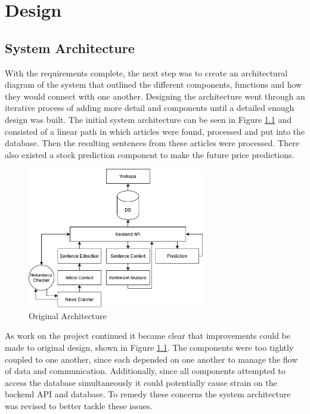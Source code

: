 \chapter{Design}
\label{Design}

    \section{System Architecture}
    \label{des:system_arch}
    With the requirements complete, the next step was to create an architectural diagram of the system that outlined the different components, functions and how they would connect with one another. Designing the architecture went through an iterative process of adding more detail and components until a detailed enough design was built. The initial system architecture can be seen in Figure \ref{fig:architecture_orginal} and consisted of a linear path in which articles were found, processed and put into the database. Then the resulting sentences from these articles were processed. There also existed a stock prediction component to make the future price predictions.
    
    \begin{figure}[!h]
        \centering
        \includegraphics[width=0.7\textwidth]{images/upload/Architecture_origonal.png}
        \caption{Original Architecture}
        \label{fig:architecture_orginal}
    \end{figure}
    
    As work on the project continued it became clear that improvements could be made to original design, shown in Figure \ref{fig:architecture_orginal}. The components were too tightly coupled to one another, since each depended on one another to manage the flow of data and communication. Additionally, since all components attempted to access the database simultaneously it could potentially cause strain on the backend API and database. To remedy these concerns the system architecture was revised to better tackle these issues. 
    
